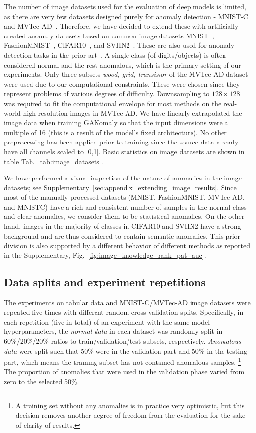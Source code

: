 The number of image datasets used for the evaluation of deep models is limited, as there are very few datasets designed purely for anomaly detection - MNIST-C~\cite{muMNISTCRobustnessBenchmark2019} and MVTec-AD~\cite{bergmann2019mvtec}. Therefore, we have decided to extend these with artificially created anomaly datasets based on common image datasets MNIST~\cite{lecun2010mnist}, FashionMNIST~\cite{xiao2017fashion}, CIFAR10~\cite{krizhevsky2009learning}, and SVHN2~\cite{netzer2011reading}. These are also used for anomaly detection tasks in the prior art~\cite{perera2019ocgan, pidhorskyi2018generative, ruff2018deep}. A single class (of digits/objects) is often considered normal and the rest anomalous, which is the primary setting of our experiments. Only three subsets \textit{wood, grid, transistor} of the MVTec-AD dataset were used due to our computational constraints. These were chosen since they represent problems of various degrees of difficulty. Downsampling to $128 \times 128$ was required to fit the computational envelope for most methods on the real-world high-resolution images in MVTec-AD.  We have linearly extrapolated the image data when training GANomaly so that the input dimensions were a multiple of 16 (this is a result of the model's fixed architecture). No other preprocessing has been applied prior to training since the source data already have all channels scaled to [0,1].  Basic statistics on image datasets are shown in table Tab.~\ref{tab:image_datasets}. 

We have performed a visual inspection of the nature of anomalies in the image datasets; see Supplementary~\ref{sec:appendix_extending_image_results}. Since most of the manually processed datasets (MNIST, FashionMNIST, MVTec-AD, and MNISTC) have a rich and consistent number of samples in the normal class and clear anomalies, we consider them to be statistical anomalies. On the other hand, images in the majority of classes in CIFAR10 and SVHN2 have a strong background and are thus considered to contain semantic anomalies. This prior division is also supported by a different behavior of different methods as reported in the Supplementary, Fig.~\ref{fig:image_knowledge_rank_pat_auc}. 

\subsection{Data splits and experiment repetitions}
\label{sec:repetitions}
The experiments on tabular data and MNIST-C/MVTec-AD image datasets were repeated five times with different random cross-validation splits. Specifically, in each repetition (five in total) of an experiment with the same model hyperparameters, the \textit{normal data} in each dataset was randomly split in 60\%/20\%/20\% ratios to train/validation/test subsets, respectively. \textit{Anomalous data} were split such that 50\% were in the validation part and 50\% in the testing part, which means the training subset has not contained anomalous samples. \footnote{A training set without any anomalies is in practice very optimistic, but this decision removes another degree of freedom from the evaluation for the sake of clarity of results.} The proportion of anomalies that were used in the validation phase varied from zero to the selected 50\%. 

